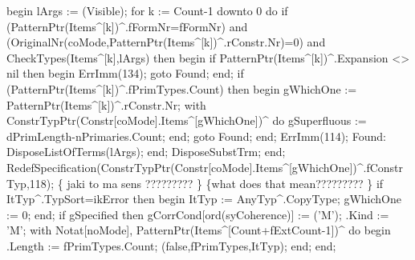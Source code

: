       begin
         lArgs := (Visible);
         for k := Count-1 downto 0 do
            if (PatternPtr(Items^[k])^.fFormNr=fFormNr) and
                  (OriginalNr(coMode,PatternPtr(Items^[k])^.rConstr.Nr)=0) and
                  CheckTypes(Items^[k],lArgs) then
            begin
               if PatternPtr(Items^[k])^.Expansion <> nil then
               begin
                  ErrImm(134);
                  goto Found;
               end;
               if (PatternPtr(Items^[k])^.fPrimTypes.Count) then
               begin
                  gWhichOne := PatternPtr(Items^[k])^.rConstr.Nr;
                  with ConstrTypPtr(Constr[coMode].Items^[gWhichOne])^ do
                     gSuperfluous := dPrimLength-nPrimaries.Count;
               end;
               goto Found;
            end;
         ErrImm(114);
         Found:
            DisposeListOfTerms(lArgs);
      end;
      DisposeSubstTrm;
   end;
   RedefSpecification(ConstrTypPtr(Constr[coMode].Items^[gWhichOne])^.fConstrTyp,118);
   \{ jaki to ma sens ????????? \} \{what does that mean????????? \}
   if ItTyp^.TypSort=ikError then
   begin
      ItTyp := AnyTyp^.CopyType;
      gWhichOne := 0;
   end;
   if gSpecified then gCorrCond[ord(syCoherence)] := ('M');
   .Kind := 'M';
   with Notat[noMode], PatternPtr(Items^[Count+fExtCount-1])^ do
   begin
      .Length := fPrimTypes.Count;
      (false,fPrimTypes,ItTyp);
   end;
end;
\eatline
